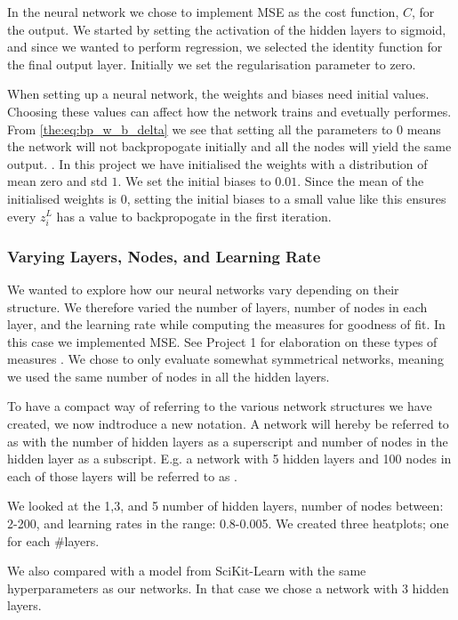         In the neural network we chose to implement MSE as the cost function, $C$, for the output. We started by setting the activation of the hidden layers to sigmoid, and since we wanted to perform regression, we selected the identity function for the final output layer. Initially we set the regularisation parameter to zero. 

        When setting up a neural network, the weights and biases need initial values. Choosing these values can affect how the network trains and evetually performes. From \cref{the:eq:bp_w_b_delta} we see that setting all the parameters to $0$ means the network will not backpropogate initially and all the nodes will yield the same output. . In this project we have initialised the weights with a distribution of mean zero and std $1$. We set the initial biases to $0.01$. Since the mean of the initialised weights is 0, setting the initial biases to a small value like this ensures every $z_i^L$ has a value to backpropogate in the first iteration.  
    
    \subsubsection{Varying Layers, Nodes, and Learning Rate}
        We wanted to explore how our neural networks vary depending on their structure. We therefore varied the number of layers, number of nodes in each layer, and the learning rate while computing the measures for goodness of fit. In this case we implemented MSE. See Project 1 for elaboration on these types of measures \citep{Project1}.
        We chose to only evaluate somewhat symmetrical networks, meaning we used the same number of nodes in all the hidden layers.

        To have a compact way of referring to the various network structures we have created, we now indtroduce a new notation. A network will hereby be referred to as  with the number of hidden layers as a superscript and number of nodes in the hidden layer as a subscript. E.g. a network with 5 hidden layers and 100 nodes in each of those layers will be referred to as .  

        We looked at the 1,3, and 5 number of hidden layers, number of nodes between: 2-200, and learning rates in the range: 0.8-0.005. We created three heatplots; one for each \#layers. 

        We also compared with a model from SciKit-Learn with the same hyperparameters as our networks. In that case we chose a network with 3 hidden layers. 

